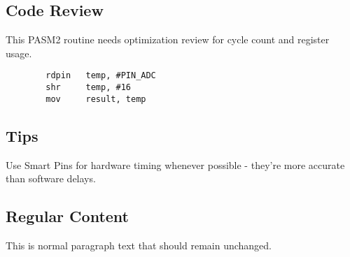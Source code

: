 \subsection{Code Review}

\begin{needscodereview}
This PASM2 routine needs optimization review for cycle count and register usage.

\begin{verbatim}
        rdpin   temp, #PIN_ADC
        shr     temp, #16
        mov     result, temp
\end{verbatim}
\end{needscodereview}

\subsection{Tips}

\begin{tipbox}
Use Smart Pins for hardware timing whenever possible - they're more accurate than software delays.
\end{tipbox}

\subsection{Regular Content}

This is normal paragraph text that should remain unchanged.